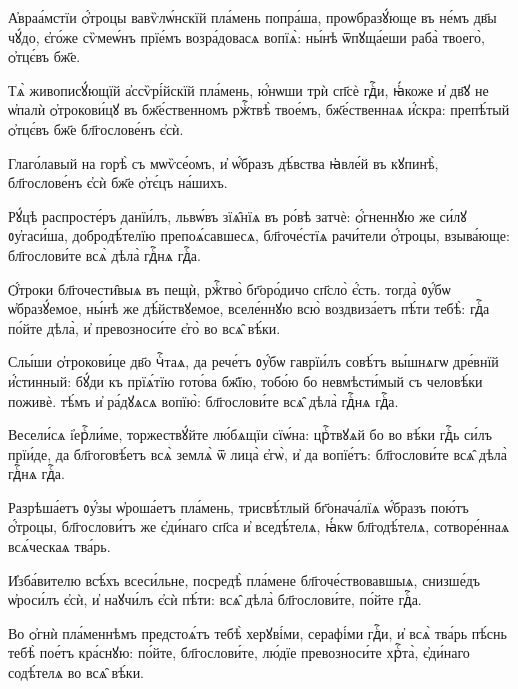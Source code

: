 \hKv А҆враа́мстїи ѻ҆́троцы вавѷлѡ́нскїй пла́мень попра́ша,  проѡбразꙋ́юще въ не́мъ дв҃ы чꙋ́до, є҆го́же сѷмеѡ́нъ  прїе́мъ возра́довасѧ вопїѧ̀: ны́нѣ ѿпꙋща́еши раба̀  твоего̀, ѻ҆тцє́въ бж҃е. 

\hKv Тѧ̀ живописꙋ́ющїй а҆ссѷрі́йскїй пла́мень, ю҆́нѡши трѝ  сп҃сѐ гдⷭ҇и, ꙗ҆́коже и҆ дв҃ꙋ не ѡ҆палѝ ѻ҆трокови́цꙋ въ  бж҃е́ственномъ ржⷭ҇твѣ̀ твое́мъ, бж҃е́ственнаѧ и҆́скра:  препѣ́тый ѻ҆тцє́въ бж҃е бл҃гослове́нъ є҆сѝ. 

\hKv Глаго́лавый на горѣ̀ съ мѡѷсе́омъ, и҆ ѡ҆́бразъ дѣ́вства  ꙗ҆вле́й въ кꙋпинѣ̀, бл҃гослове́нъ є҆сѝ бж҃е ѻ҆тє́цъ  на́шихъ. 
%

\hKv Рꙋ́цѣ распросте́ръ данїи́лъ, львѡ́въ зїѧ̑нїѧ въ ро́вѣ  затчѐ: ѻ҆́гненнꙋю же си́лꙋ ᲂу҆гаси́ша, добродѣ́телїю  препоѧ́савшесѧ, бл҃гоче́стїѧ   рачи́тели ѻ҆́троцы, взыва́юще: бл҃гослови́те всѧ̀ дѣла̀  гдⷭ҇нѧ гдⷭ҇а.  
%

\hKv Ѻ҆́троки бл҃гочести̑выѧ въ пещѝ,  ржⷭ҇тво̀ бг҃оро́дичо сп҃сло̀ є҆́сть. тогда̀ ᲂу҆́бѡ  ѡ҆бразꙋ́емое, ны́нѣ же дѣ́йствꙋемое, вселе́ннꙋю всю̀  воздвиза́етъ пѣ́ти тебѣ̀: гдⷭ҇а по́йте дѣла̀, и҆  превозноси́те є҆го̀ во всѧ̑ вѣ́ки. 
%

\hKv Слы́ши ѻ҆трокови́це дв҃о чⷭ҇таѧ, да рече́тъ ᲂу҆́бѡ  гаврїи́лъ совѣ́тъ вы́шнѧгѡ дре́внїй и҆́стинный: бꙋ́ди къ  прїѧ́тїю гото́ва бж҃їю, тобо́ю бо невмѣсти́мый съ  человѣ́ки поживѐ. тѣ́мъ и҆ ра́дꙋѧсѧ вопїю̀: бл҃гослови́те  всѧ̑ дѣла̀ гдⷭ҇нѧ гдⷭ҇а. 
%

\hKv Весели́сѧ і҆ерⷭ҇ли́ме, торжествꙋ́йте  лю́бѧщїи сїѡ́на: црⷭ҇твꙋѧй бо во вѣ́ки гдⷭ҇ь си́лъ прїи́де,  да бл҃гоговѣ́етъ всѧ̀ землѧ̀ ѿ лица̀ є҆гѡ̀, и҆ да  вопїе́тъ: бл҃гослови́те всѧ̑ дѣла̀ гдⷭ҇нѧ гдⷭ҇а. 
%

\hKv Разрѣша́етъ ᲂу҆́зы ѡ҆роша́етъ  пла́мень, трисвѣ́тлый бг҃онача́лїѧ  ѡ҆́бразъ пою́тъ ѻ҆́троцы, бл҃гослови́тъ же є҆ди́наго  сп҃са и҆ вседѣ́телѧ, ꙗ҆́кѡ бл҃годѣ́телѧ, сотворе́ннаѧ  всѧ́ческаѧ тва́рь. 
%

\hKv И҆зба́вителю всѣ́хъ всеси́льне, посредѣ̀ пла́мене  бл҃гоче́ствовавшыѧ, снизше́дъ ѡ҆роси́лъ є҆сѝ, и҆ наꙋчи́лъ  є҆сѝ пѣ́ти: всѧ̑ дѣла̀ бл҃гослови́те, по́йте гдⷭ҇а. 

\hKv Во ѻ҆гнѝ пла́меннѣмъ предстоѧ́тъ тебѣ̀ херꙋві́ми,  серафі́ми гдⷭ҇и, и҆ всѧ̀ тва́рь пѣ́снь тебѣ̀ пое́тъ  кра́снꙋю: по́йте, бл҃гослови́те, лю́дїе превозноси́те  хрⷭ҇та̀, є҆ди́наго содѣ́телѧ во всѧ̑ вѣ́ки. 

